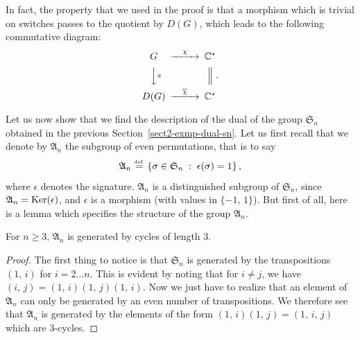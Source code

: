\begin{rem}
In fact, the property that we used in the proof is that a morphism which is trivial on switches passes to the quotient by $ D(G)$, which leads to the following commutative diagram:
\begin{equation*}
\begin{CD} G @>{\chi} >> \CC^* \\@VV{\pi} V @ |\\D(G) @>{\ol{\chi}} >> \CC^* \end{CD}.
\end{equation*}
\end{rem}



\label{notation-20}  Let us now show that we find the description of the dual of the group $\mathfrak{S}_n $ obtained in the previous Section~\ref{sect2-exmp-dual-sn}. Let us first recall that we denote by $\mathfrak{A}_n $ the subgroup of even permutations, that is to say
\begin{equation*}
\mathfrak{A}_n \stackrel{\mbox{\upshape\tiny def.}}{=} \left\{ \sigma \in \mathfrak{S}_n \;:\; \epsilon(\sigma) = 1 \right\},
\end{equation*}
where $\epsilon $ denotes the signature. $\mathfrak{A}_n $ is a distinguished subgroup of $\mathfrak{S}_n $, since $\mathfrak{A}_n = \operatorname{Ker}(\epsilon)$, and $\epsilon $ is a morphism (with values in $\{- 1, \, 1\}$). But first of all, here is a lemma which specifies the structure of the group $\mathfrak{A}_n $.

\begin{lem}
For $n \geq 3 $, $\mathfrak{A}_n $ is generated by cycles of length $ 3 $.
\end{lem}
\begin{proof}
The first thing to notice is that $\mathfrak{S}_n $ is generated by the transpositions $ (1, \, i)$ for $ i = 2 \ldots n $. This is evident by noting that for $ i \neq j $, we have $ (i, \, j) = (1, \, i) (1, \, j) (1, \, i)$. Now we just have to realize that an element of $\mathfrak{A}_n $ can only be generated by an even number of transpositions. We therefore see that $\mathfrak{A}_n $ is generated by the elements of the form $ (1, \, i) (1, \, j) = (1, \, i, \, j)$ which are 3-cycles.
\end{proof}


